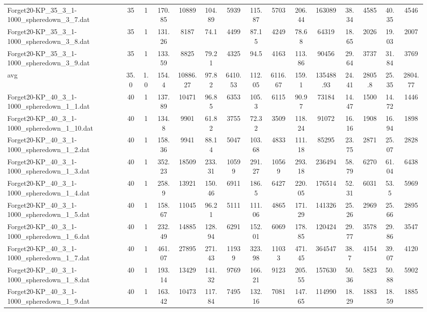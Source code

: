 \begin{table}[!ht]
{\begin{tabular}{lcccccccccccccc}
Forget20-KP\_35\_3\_1-1000\_spheredown\_3\_7.dat & 35 & 1 & 170.85 & 10889 & 104.89 & 5939 & 115.87 & 5703 & 206.44 & 163089 & 38.34 & 4585 & 40.35 & 4546 \\
Forget20-KP\_35\_3\_1-1000\_spheredown\_3\_8.dat & 35 & 1 & 131.26 & 8187 & 74.1 & 4499 & 87.15 & 4249 & 78.68 & 64319 & 18.65 & 2026 & 19.03 & 2007 \\
Forget20-KP\_35\_3\_1-1000\_spheredown\_3\_9.dat & 35 & 1 & 133.59 & 8825 & 79.21 & 4325 & 94.5 & 4163 & 113.86 & 90456 & 29.64 & 3737 & 31.84 & 3769 \\
\hline avg & 35.0 & 1.0 & 154.4& 10886.27 & 97.82& 6410.53 & 112.05& 6116.67 & 159.1& 135488.93 & 24.41& 2805.8 & 25.35& 2804.77\\ \hline
Forget20-KP\_40\_3\_1-1000\_spheredown\_1\_1.dat & 40 & 1 & 137.89 & 10471 & 96.85 & 6353 & 105.3 & 6115 & 90.97 & 73184 & 14.47 & 1500 & 14.72 & 1446 \\
Forget20-KP\_40\_3\_1-1000\_spheredown\_1\_10.dat & 40 & 1 & 134.8 & 9901 & 61.82 & 3755 & 72.32 & 3509 & 118.24 & 91072 & 16.16 & 1908 & 16.94 & 1898 \\
Forget20-KP\_40\_3\_1-1000\_spheredown\_1\_2.dat & 40 & 1 & 158.36 & 9941 & 88.14 & 5047 & 103.68 & 4833 & 111.18 & 85295 & 23.75 & 2871 & 25.07 & 2828 \\
Forget20-KP\_40\_3\_1-1000\_spheredown\_1\_3.dat & 40 & 1 & 352.23 & 18509 & 233.31 & 10599 & 291.27 & 10569 & 293.18 & 236494 & 58.79 & 6270 & 61.04 & 6438 \\
Forget20-KP\_40\_3\_1-1000\_spheredown\_1\_4.dat & 40 & 1 & 258.9 & 13921 & 150.46 & 6911 & 186.5 & 6427 & 220.05 & 176514 & 52.31 & 6031 & 53.5 & 5969 \\
Forget20-KP\_40\_3\_1-1000\_spheredown\_1\_5.dat & 40 & 1 & 158.67 & 11045 & 96.21 & 5111 & 111.06 & 4865 & 171.29 & 141326 & 25.26 & 2969 & 25.66 & 2895 \\
Forget20-KP\_40\_3\_1-1000\_spheredown\_1\_6.dat & 40 & 1 & 232.49 & 14885 & 128.94 & 6291 & 152.01 & 6069 & 178.85 & 120424 & 29.77 & 3578 & 29.86 & 3547 \\
Forget20-KP\_40\_3\_1-1000\_spheredown\_1\_7.dat & 40 & 1 & 461.07 & 27895 & 271.43 & 11939 & 323.98 & 11033 & 471.45 & 364547 & 38.7 & 4154 & 39.07 & 4120 \\
Forget20-KP\_40\_3\_1-1000\_spheredown\_1\_8.dat & 40 & 1 & 193.14 & 13429 & 141.32 & 9769 & 166.21 & 9123 & 205.55 & 157630 & 50.36 & 5823 & 50.88 & 5902 \\
Forget20-KP\_40\_3\_1-1000\_spheredown\_1\_9.dat & 40 & 1 & 163.42 & 10473 & 117.84 & 7495 & 132.16 & 7081 & 147.65 & 114990 & 18.29 & 1883 & 18.59 & 1885 \\

\end{tabular}}
\end{table}

